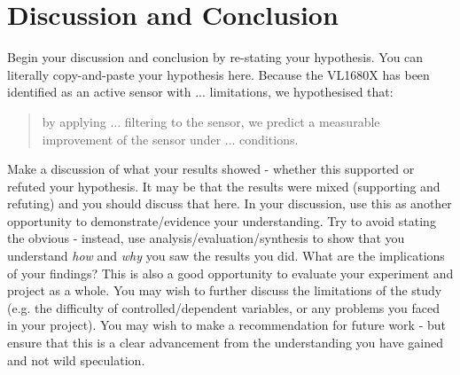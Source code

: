 \documentclass[conference]{IEEEtran}
\begin{document}
\section{Discussion and Conclusion}
Begin your discussion and conclusion by re-stating your hypothesis.  You can literally copy-and-paste your hypothesis here.  
Because the VL1680X has been identified as an active sensor with ... limitations, we hypothesised that:
\begin{quote}
    by applying ... filtering to the sensor, we predict a measurable improvement of the sensor under ... conditions.  
\end{quote}
Make a discussion of what your results showed - whether this supported or refuted your hypothesis.  It may be that the results were mixed (supporting and refuting) and you should discuss that here. In your discussion, use this as another opportunity to demonstrate/evidence your understanding. Try to avoid stating the obvious - instead, use analysis/evaluation/synthesis to show that you understand \emph{how} and \emph{why} you saw the results you did.  What are the implications of your findings?  
This is also a good opportunity to evaluate your experiment and project as a whole.  You may wish to further discuss the limitations of the study (e.g. the difficulty of controlled/dependent variables, or any problems you faced in your project).  You may wish to make a recommendation for future work - but ensure that this is a clear advancement from the understanding you have gained and not wild speculation.


 


\newpage
\onecolumn
\appendix
\end{document}
